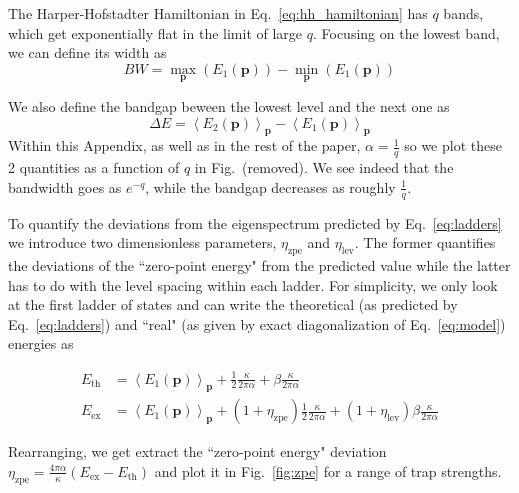 \documentclass[twocolumn, 10pt, aps, superscriptaddress, floatfix, showpacs, pra, citeautoscript]{revtex4-1}
\newcommand{\vt}[1]{\mathbf{#1}}
\newcommand{\co}[2]{#2}
\renewcommand{\paragraph}{\co}
\begin{document}
The Harper-Hofstadter Hamiltonian in Eq.~\eqref{eq:hh_hamiltonian} has
$q$ bands, which get exponentially flat in the limit of large
$q$. Focusing on the lowest band, we can define its width as
\begin{equation}
 BW = \max_{\vt{p}}(E_1(\vt{p})) - \min_{\vt{p}}(E_1(\vt{p})) 
\end{equation}

\paragraph{The scaling of bandwidth and bandgap with q is different.}
We also define the bandgap beween the lowest level and the next one as
\begin{equation}
  \Delta E = \left<E_2(\vt{p})\right>_{\vt{p}} - \left<E_1(\vt{p})\right>_{\vt{p}}
\end{equation}
Within this Appendix, as well as in the rest of the paper,
$\alpha=\frac{1}{q}$ so we plot these 2 quantities as a function of
$q$ in Fig.~(removed). We see indeed that the bandwidth
goes as $e^{-q}$, while the bandgap decreases as roughly
$\frac{1}{q}$.

To quantify the deviations from the eigenspectrum predicted by
Eq.~\eqref{eq:ladders} we introduce two dimensionless parameters,
$\eta_{\text{zpe}}$ and $\eta_{\text{lev}}$. The former quantifies the
deviations of the ``zero-point energy" from the predicted value while the
latter has to do with the level spacing within each ladder. For
simplicity, we only look at the first ladder of states and can write
the theoretical (as predicted by Eq.~\eqref{eq:ladders}) and ``real"
(as given by exact diagonalization of Eq.~\eqref{eq:model}) energies as

\begin{subequations}
  \begin{align}
    E_{\text{th}} &= \left<E_1(\vt{p})\right>_{\vt{p}} + \frac{1}{2}\frac{\kappa}{2\pi\alpha} + \beta \frac{\kappa}{2\pi\alpha}\\
    E_{\text{ex}} &= \left<E_1(\vt{p})\right>_{\vt{p}} +
          (1+\eta_{\text{zpe}})\frac{1}{2}\frac{\kappa}{2\pi\alpha} +
          (1+\eta_{\text{lev}})\beta \frac{\kappa}{2\pi\alpha}
  \end{align}   
\end{subequations}


Rearranging, we get extract the ``zero-point energy" deviation
$\eta_{\text{zpe}} = \frac{4\pi\alpha}{\kappa} (E_{\text{ex}} - E_{\text{th}})$ and plot
it in Fig.~\ref{fig:zpe} for a range of trap strengths.
\end{document}
